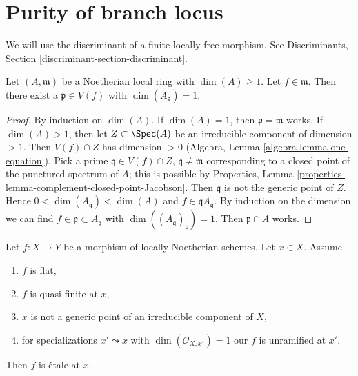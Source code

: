 \section{Purity of branch locus}
\label{section-purity}

\noindent
We will use the discriminant of a finite locally free morphism. See
Discriminants, Section \ref{discriminant-section-discriminant}.

\begin{lemma}
\label{lemma-find-point-codim-1}
Let $(A, \mathfrak m)$ be a Noetherian local ring with $\dim(A) \geq 1$.
Let $f \in \mathfrak m$. Then there exist a $\mathfrak p \in V(f)$ with
$\dim(A_\mathfrak p) = 1$.
\end{lemma}

\begin{proof}
By induction on $\dim(A)$. If $\dim(A) = 1$, then $\mathfrak p = \mathfrak m$
works. If $\dim(A) > 1$, then let $Z \subset \Spec(A)$ be an irreducible
component of dimension $> 1$. Then $V(f) \cap Z$ has dimension $> 0$
(Algebra, Lemma \ref{algebra-lemma-one-equation}). Pick a prime
$\mathfrak q \in V(f) \cap Z$, $\mathfrak q \not = \mathfrak m$
corresponding to a closed point of the punctured spectrum of $A$;
this is possible by
Properties, Lemma \ref{properties-lemma-complement-closed-point-Jacobson}.
Then $\mathfrak q$ is not the generic point of $Z$. Hence
$0 < \dim(A_\mathfrak q) < \dim(A)$ and $f \in \mathfrak q A_\mathfrak q$.
By induction on the dimension we can find
$f \in \mathfrak p \subset A_\mathfrak q$ with
$\dim((A_\mathfrak q)_\mathfrak p) = 1$.
Then $\mathfrak p \cap A$ works.
\end{proof}

\begin{lemma}
\label{lemma-ramification-quasi-finite-flat}
Let $f : X \to Y$ be a morphism of locally Noetherian schemes.
Let $x \in X$. Assume
\begin{enumerate}
\item $f$ is flat,
\item $f$ is quasi-finite at $x$,
\item $x$ is not a generic point of an irreducible component of $X$,
\item for specializations $x' \leadsto x$ with
$\dim(\mathcal{O}_{X, x'}) = 1$ our $f$ is unramified at $x'$.
\end{enumerate}
Then $f$ is \'etale at $x$.
\end{lemma}

